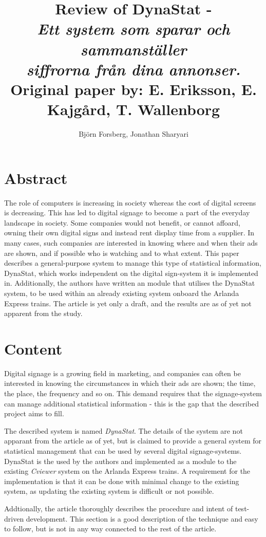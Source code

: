 \documentclass[a4paper,10pt]{article}
\title{Review of DynaStat - \\
	\emph{Ett system som sparar och sammanställer} \\
	\emph{siffrorna från dina annonser.}\\
	\vspace{3mm} \normalsize Original paper by: E. Eriksson, E. Kajgård, T. Wallenborg}
\author{Bj{\"o}rn Forsberg, Jonathan Sharyari}
\begin{document}
\maketitle


\section{Abstract}

The role of computers is increasing in society whereas the cost of digital screens is decreasing. This has led to digital signage to become a part of the everyday landscape in society. Some companies would not benefit, or cannot affoard, owning their own digital signs and instead rent display time from a supplier. In many cases, such companies are interested in knowing where and when their ads are shown, and if possible who is watching and to what extent. This paper describes a general-purpose system to manage this type of statistical information, DynaStat, which works independent on the digital sign-system it is implemented in. Additionally, the authors have written an module that utilises the DynaStat system, to be used within an already existing system onboard the Arlanda Express trains. The article is yet only a draft, and the results are as of yet not apparent from the study.

\section{Content}
Digital signage is a growing field in marketing, and companies can often be interested in knowing the circumstances in which their ads are shown; the time, the place, the frequency and so on. This demand requires that the signage-system can manage additional statistical information - this is the gap that the described project aims to fill.

The described system is named \emph{DynaStat}. The details of the system are not apparant from the article as of yet, but is claimed to provide a general system for statistical management that can be used by several digital signage-systems. DynaStat is the used by the authors and implemented as a module to the existing \emph{Cviewer} system on the Arlanda Express trains. A requirement for the implementation is that it can be done with minimal change to the existing system, as updating the existing system is difficult or not possible.

Addtionally, the article thoroughly describes the procedure and intent of test-driven development. This section is a good description of the technique and easy to follow, but is not in any way connected to the rest of the article. 
\end{document}

